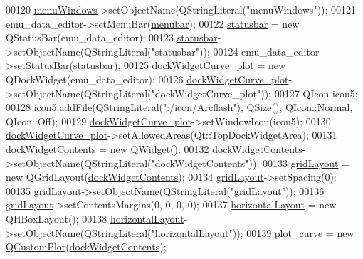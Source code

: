 \begin{DoxyCode}
00120         \hyperlink{a00079_a0c7cba2d30d21689f48f1981e976c0b6}{menuWindows}->setObjectName(QStringLiteral(\textcolor{stringliteral}{"menuWindows"}));
00121         emu\_data\_editor->setMenuBar(\hyperlink{a00079_af09fe2fe1f34525f5caeb5ada7d297bf}{menubar});
00122         \hyperlink{a00079_ab06a6e9bb964fc017cb9a246ee1f9ecb}{statusbar} = \textcolor{keyword}{new} QStatusBar(emu\_data\_editor);
00123         \hyperlink{a00079_ab06a6e9bb964fc017cb9a246ee1f9ecb}{statusbar}->setObjectName(QStringLiteral(\textcolor{stringliteral}{"statusbar"}));
00124         emu\_data\_editor->setStatusBar(\hyperlink{a00079_ab06a6e9bb964fc017cb9a246ee1f9ecb}{statusbar});
00125         \hyperlink{a00079_a0edc87fb115fede171c0da1f99000874}{dockWidgetCurve\_plot} = \textcolor{keyword}{new} QDockWidget(emu\_data\_editor);
00126         \hyperlink{a00079_a0edc87fb115fede171c0da1f99000874}{dockWidgetCurve\_plot}->setObjectName(QStringLiteral(\textcolor{stringliteral}{"dockWidgetCurve\_plot"}));
00127         QIcon icon5;
00128         icon5.addFile(QStringLiteral(\textcolor{stringliteral}{":/icon/Arcflash"}), QSize(), QIcon::Normal, QIcon::Off);
00129         \hyperlink{a00079_a0edc87fb115fede171c0da1f99000874}{dockWidgetCurve\_plot}->setWindowIcon(icon5);
00130         \hyperlink{a00079_a0edc87fb115fede171c0da1f99000874}{dockWidgetCurve\_plot}->setAllowedAreas(Qt::TopDockWidgetArea);
00131         \hyperlink{a00079_a78f9e81c1adc0092b7e4d6efb640dc43}{dockWidgetContents} = \textcolor{keyword}{new} QWidget();
00132         \hyperlink{a00079_a78f9e81c1adc0092b7e4d6efb640dc43}{dockWidgetContents}->setObjectName(QStringLiteral(\textcolor{stringliteral}{"dockWidgetContents"}));
00133         \hyperlink{a00079_ad06b82b83a9a74377d6ca44ae699f945}{gridLayout} = \textcolor{keyword}{new} QGridLayout(\hyperlink{a00079_a78f9e81c1adc0092b7e4d6efb640dc43}{dockWidgetContents});
00134         \hyperlink{a00079_ad06b82b83a9a74377d6ca44ae699f945}{gridLayout}->setSpacing(0);
00135         \hyperlink{a00079_ad06b82b83a9a74377d6ca44ae699f945}{gridLayout}->setObjectName(QStringLiteral(\textcolor{stringliteral}{"gridLayout"}));
00136         \hyperlink{a00079_ad06b82b83a9a74377d6ca44ae699f945}{gridLayout}->setContentsMargins(0, 0, 0, 0);
00137         \hyperlink{a00079_ad3009fa6ef8958b3e052715beba75d28}{horizontalLayout} = \textcolor{keyword}{new} QHBoxLayout();
00138         \hyperlink{a00079_ad3009fa6ef8958b3e052715beba75d28}{horizontalLayout}->setObjectName(QStringLiteral(\textcolor{stringliteral}{"horizontalLayout"}));
00139         \hyperlink{a00079_a1d46308dee8db7e3c99af65f13055479}{plot\_curve} = \textcolor{keyword}{new} \hyperlink{a00030_d8/d00/a00186}{QCustomPlot}(\hyperlink{a00079_a78f9e81c1adc0092b7e4d6efb640dc43}{dockWidgetContents});

\end{DoxyCode}
